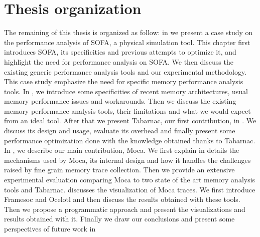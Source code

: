 \section{Thesis organization}

The remaining of this thesis is organized as follow:
in  we present a case study on the performance analysis of \gls{SOFA}, a physical simulation tool.
This chapter first introduces \gls{SOFA}, its specificities and previous attempts to optimize it, and highlight the need for performance analysis on \gls{SOFA}.
We then discuss the existing generic performance analysis tools and our experimental methodology.
This case study emphasize the need for specific memory performance analysis tools.
In , we introduce some specificities of recent memory architectures, usual memory performance issues and workarounds.
Then we discuss the existing memory performance analysis tools, their limitations and what we would expect from an ideal tool.
After that we present \gls{Tabarnac}, our first contribution, in .
We discuss its design and usage, evaluate its overhead and finally present some performance optimization done with the knowledge obtained thanks to \gls{Tabarnac}.
In , we describe our main contribution, \gls{Moca}.
We first explain in details the mechanisms used by \gls{Moca}, its internal design and how it handles the challenges raised by fine grain memory trace collection.
Then we provide an extensive experimental evaluation comparing \gls{Moca} to two state of the art memory analysis tools and \gls{Tabarnac}.
 discusses the visualization of \gls{Moca} traces.
We first introduce \gls{Framesoc} and \gls{Ocelotl} and then discuss the results obtained with these tools.
Then we propose a programmatic approach and present the visualizations and results obtained with it.
Finally we draw our conclusions and present some perspectives of future work in 

\glsresetall
